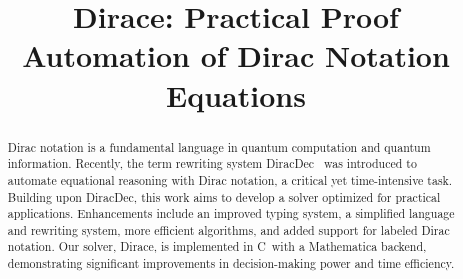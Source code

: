 \documentclass[runningheads]{llncs}
\newcommand{\CC}{C\nolinebreak\hspace{-.05em}\raisebox{.4ex}{\tiny\bf +}\nolinebreak\hspace{-.10em}\raisebox{.4ex}{\tiny\bf +}}
\def\CC{{C\nolinebreak[4]\hspace{-.05em}\raisebox{.4ex}{\tiny\bf ++}}}
\begin{document}
%
\title{Dirace: Practical Proof Automation of Dirac Notation Equations}




%
\maketitle              %
%
\begin{abstract}
Dirac notation is a fundamental language in quantum computation and quantum information. Recently, the term rewriting system DiracDec~\cite{diracdec} was introduced to automate equational reasoning with Dirac notation, a critical yet time-intensive task. Building upon DiracDec, this work aims to develop a solver optimized for practical applications. Enhancements include an improved typing system, a simplified language and rewriting system, more efficient algorithms, and added support for labeled Dirac notation. Our solver, Dirace, is implemented in \CC\ with a Mathematica backend, demonstrating significant improvements in decision-making power and time efficiency.


\end{abstract}
%
%
%



\newcommand*{\sem}[1]{{\llbracket #1 \rrbracket}}
\newcommand{\DiracDec}{\textsf{DiracDec}}

\newcommand{\reduce}{\triangleright}
\end{document}
